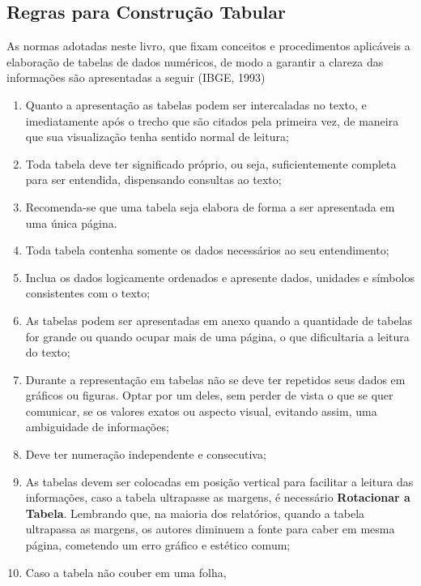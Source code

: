 

\newpage
\subsection{Regras para Construção Tabular}

\inic As normas adotadas neste livro, que fixam conceitos e procedimentos aplicáveis a elaboração de tabelas de dados numéricos, de modo a garantir a clareza das informações são apresentadas a seguir (IBGE, 1993)


\begin{enumerate}
\item Quanto a apresentação as tabelas podem ser intercaladas no texto, e imediatamente após o trecho que são citados pela primeira vez, de maneira que sua visualização tenha sentido normal de leitura;  
\item Toda tabela deve ter significado próprio, ou seja, suficientemente completa para ser entendida, dispensando consultas ao texto; 
\item Recomenda-se que uma tabela seja elabora
de forma a ser apresentada em uma única página.
\item Toda tabela contenha somente os dados necessários ao seu entendimento;
\item Inclua os dados logicamente ordenados e apresente dados, unidades e símbolos consistentes com o texto;
\item As tabelas podem ser apresentadas em anexo quando a quantidade de tabelas for grande ou quando ocupar mais de uma página, o que dificultaria a leitura do texto; 
\item Durante a representação em tabelas não se deve ter repetidos seus dados em gráficos ou figuras. Optar por um deles, sem perder de vista o que se quer comunicar, se os valores exatos ou aspecto visual, evitando assim, uma ambiguidade de informações;
\item Deve ter numeração independente e consecutiva; 
\item As tabelas devem ser colocadas em posição vertical para facilitar a leitura das informações, caso a tabela ultrapasse as margens, é necessário \textbf{Rotacionar a Tabela}. Lembrando que, na maioria dos relatórios, quando a tabela ultrapassa as margens, os autores diminuem a fonte para caber em mesma página, cometendo um erro gráfico e estético comum; 
\item Caso a tabela não couber em uma folha,

\end{enumerate}
